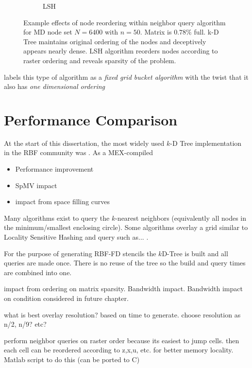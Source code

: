 \documentclass{report}
\begin{document}
\begin{figure}
\begin{subfigure}{0.425\textwidth}
\caption{LSH}
\end{subfigure}
\caption{Example effects of node reordering within neighbor query algorithm for MD node set $N=6400$ with $n=50$. Matrix is $0.78\%$ full. k-D Tree maintains original ordering of the nodes and deceptively appears nearly dense. LSH algorithm reorders nodes according to raster ordering and reveals sparsity of the problem.  }
\end{figure} 

\cite{Samet2005} labels this type of algorithm as a \emph{fixed grid bucket algorithm} with the twist that it also has \emph{one dimensional ordering}





\section{Performance Comparison}


At the start of this dissertation, the most widely used $k$-D Tree implementation in the RBF community was \cite{TagliasacchiMFE}. As a MEX-compiled 



\begin{itemize}
\item Performance improvement
\item SpMV impact
\item impact from space filling curves
\end{itemize}





Many algorithms exist to query the $k$-nearest neighbors (equivalently all nodes in the minimum/smallest enclosing circle). Some algorithms overlay a grid similar to Locality Sensitive Hashing and query such as... \cite{HarPeledMazumdar2003}.


For the purpose of generating RBF-FD stencils the $k$D-Tree is built and all queries are made once. There is no reuse of the tree so the build and query times are combined into one. 

impact from ordering on matrix sparsity. Bandwidth impact. Bandwidth impact on condition considered in future chapter. 

what is best overlay resolution? based on time to generate. choose resolution as n/2, n/9? etc? 

perform neighbor queries on raster order because its easiest to jump cells. then each cell can be reordered according to z,x,u, etc. for better memory locality. Matlab script to do this (can be ported to C)
\end{document}

